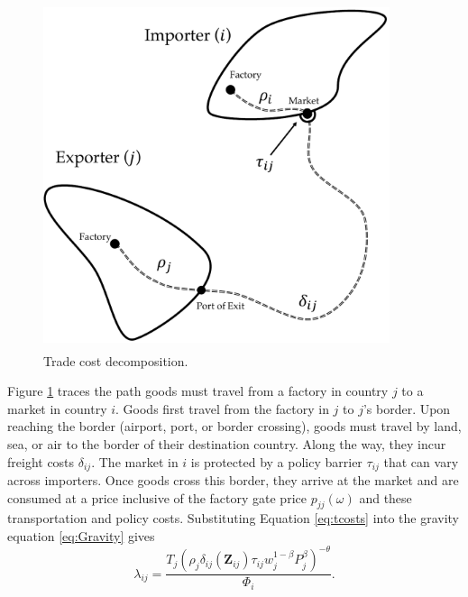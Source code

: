 \documentclass{puthesis}
\begin{document}
\begin{figure}
\centering
\includegraphics[width=4in,height=4in]{figure/tcosts.pdf}
\caption{Trade cost decomposition. \label{fig:tcostsMap}}
\end{figure}

Figure \ref{fig:tcostsMap} traces the path goods must travel from a
factory in country \(j\) to a market in country \(i\). Goods first
travel from the factory in \(j\) to \(j\)'s border. Upon reaching the
border (airport, port, or border crossing), goods must travel by land,
sea, or air to the border of their destination country. Along the way,
they incur freight costs \(\delta_{ij}\). The market in \(i\) is
protected by a policy barrier \(\tau_{ij}\) that can vary across
importers. Once goods cross this border, they arrive at the market and
are consumed at a price inclusive of the factory gate price
\(p_{jj}(\omega)\) and these transportation and policy costs.
Substituting Equation \ref{eq:tcosts} into the gravity equation
\ref{eq:Gravity} gives \[
\lambda_{ij} = \frac{ T_j \left( \rho_j \delta_{ij}(\bm{Z}_{ij}) \tau_{ij} w_j^{1 - \beta} P_j^{\beta} \right)^{- \theta} }{\Phi_i} .
\]
\end{document}
